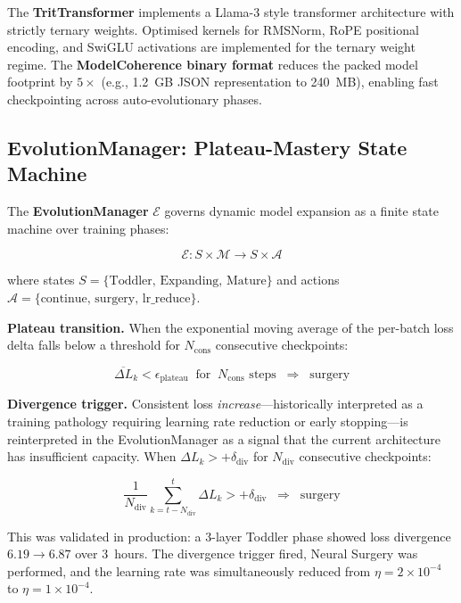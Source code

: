 \documentclass[journal,10pt,twocolumn]{IEEEtran}
\begin{document}
The \textbf{TritTransformer} implements a Llama-3 style transformer
architecture with strictly ternary weights. Optimised kernels for RMSNorm,
RoPE positional encoding, and SwiGLU activations are implemented for the
ternary weight regime. The \textbf{ModelCoherence binary format} reduces the
packed model footprint by $5\times$ (e.g., 1.2~GB JSON representation to
240~MB), enabling fast checkpointing across auto-evolutionary phases.

\subsection{EvolutionManager: Plateau-Mastery State Machine}
\label{subsec:evolution}

The \textbf{EvolutionManager} $\mathcal{E}$ governs dynamic model expansion
as a finite state machine over training phases:

\begin{equation}
  \mathcal{E}: S \times \mathcal{M} \to S \times \mathcal{A}
\end{equation}

\noindent where states $S = \{\text{Toddler},\,\text{Expanding},\,\text{Mature}\}$
and actions $\mathcal{A} = \{\text{continue},\,\text{surgery},\,\text{lr\_reduce}\}$.

\textbf{Plateau transition.} When the exponential moving average of the per-batch
loss delta falls below a threshold for $N_\text{cons}$ consecutive checkpoints:

\begin{equation}
  \overline{\Delta L}_k < \epsilon_\text{plateau}
  \;\;\text{for}\;\; N_\text{cons} \text{ steps}
  \;\;\Rightarrow\;\; \text{surgery}
  \label{eq:plateau}
\end{equation}

\textbf{Divergence trigger.} Consistent loss \emph{increase}---historically
interpreted as a training pathology requiring learning rate reduction or
early stopping---is reinterpreted in the EvolutionManager as a signal that
the current architecture has insufficient capacity. When $\Delta L_k > +\delta_\text{div}$
for $N_\text{div}$ consecutive checkpoints:

\begin{equation}
  \frac{1}{N_\text{div}}\sum_{k=t-N_\text{div}}^{t} \Delta L_k > +\delta_\text{div}
  \;\;\Rightarrow\;\; \text{surgery}
  \label{eq:divergence}
\end{equation}

This was validated in production: a 3-layer Toddler phase showed loss
divergence $6.19 \to 6.87$ over 3~hours. The divergence trigger fired,
Neural Surgery was performed, and the learning rate was simultaneously
reduced from $\eta = 2\times10^{-4}$ to $\eta = 1\times10^{-4}$.
\end{document}
